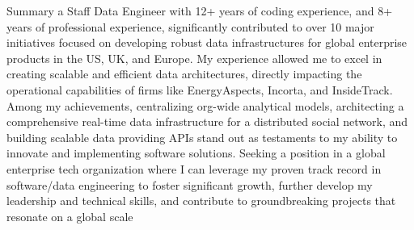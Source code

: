 \documentclass[]{ahmedamrcv}
\begin{document}
	\makeheader

    
        \begin{cvsection}{Summary}    
        a Staff Data Engineer with 12+ years of coding experience, and 8+ years of professional experience, significantly contributed to over 10 major initiatives focused on developing robust data infrastructures for global enterprise products in the US, UK, and Europe.
        \newline
        My experience allowed me to excel in creating scalable and efficient data architectures, directly impacting the operational capabilities of firms like EnergyAspects, Incorta, and InsideTrack. Among my achievements, centralizing org-wide analytical models, architecting a comprehensive real-time data infrastructure for a distributed social network, and building scalable data providing APIs stand out as testaments to my ability to innovate and implementing software solutions. 
        \newline
        Seeking a position in a global enterprise tech organization where I can leverage my proven track record in software/data engineering to foster significant growth, further develop my leadership and technical skills, and contribute to groundbreaking projects that resonate on a global scale
        \end{cvsection}
\end{document}
